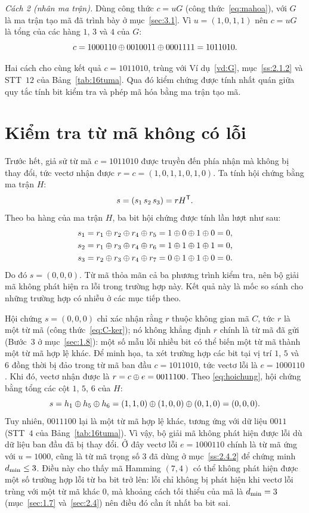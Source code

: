 \emph{Cách 2 (nhân ma trận).} Dùng công thức $c = uG$
(công thức~\eqref{eq:mahoa}), với $G$ là ma trận tạo mã đã trình bày ở
mục~\ref{sec:3.1}. Vì $u = (1,0,1,1)$ nên $c = uG$ là tổng của các hàng $1$, $3$
và $4$ của $G$:
\[
  c = 1000110 \oplus 0010011 \oplus 0001111 = 1011010 .
\]

Hai cách cho cùng kết quả $c = 1011010$, trùng với Ví dụ~\ref{vd:G},
mục~\ref{ss:2.1.2} và STT~$12$ của Bảng~\ref{tab:16tuma}. Qua đó kiểm chứng
được tính nhất quán giữa quy tắc tính bit kiểm tra và phép mã hóa bằng ma trận
tạo mã.

\section{Kiểm tra từ mã không có lỗi}
\label{sec:3.3}

Trước hết, giả sử từ mã $c = 1011010$ được truyền đến phía nhận mà không bị
thay đổi, tức vectơ nhận được $r = c = (1,0,1,1,0,1,0)$. Ta tính hội chứng bằng
ma trận $H$:
\[
  s = (s_1\,s_2\,s_3) = rH^{\mathsf{T}} .
\]
Theo ba hàng của ma trận $H$, ba bit hội chứng được tính lần lượt như sau:
\begin{align*}
  s_1 &= r_1 \oplus r_2 \oplus r_4 \oplus r_5 = 1 \oplus 0 \oplus 1 \oplus 0 = 0,\\*
  s_2 &= r_1 \oplus r_3 \oplus r_4 \oplus r_6 = 1 \oplus 1 \oplus 1 \oplus 1 = 0,\\*
  s_3 &= r_2 \oplus r_3 \oplus r_4 \oplus r_7 = 0 \oplus 1 \oplus 1 \oplus 0 = 0 .
\end{align*}
Do đó $s = (0,0,0)$. Từ mã thỏa mãn cả ba phương trình kiểm tra, nên bộ giải mã
không phát hiện ra lỗi trong trường hợp này. Kết quả này là mốc so sánh cho
những trường hợp có nhiễu ở các mục tiếp theo.

Hội chứng $s = (0,0,0)$ chỉ xác nhận rằng $r$ thuộc không gian mã $C$, tức $r$
là một từ mã (công thức~\eqref{eq:C-ker}); nó không khẳng định $r$ chính là từ
mã đã gửi (Bước~3 ở mục~\ref{sec:1.8}): một số mẫu lỗi nhiều bit có thể biến một từ
mã thành một từ mã hợp lệ khác. Để minh họa, ta xét trường hợp các bit tại vị trí $1$, $5$ và
$6$ đồng thời bị đảo trong từ mã ban đầu $c = 1011010$, tức vectơ lỗi là
$e = 1000110$. Khi đó, vectơ nhận được là $r = c \oplus e = 0011100$. Theo
\eqref{eq:hoichung}, hội chứng bằng tổng các cột $1$, $5$, $6$ của $H$:
\[
  s = h_1 \oplus h_5 \oplus h_6
    = (1,1,0) \oplus (1,0,0) \oplus (0,1,0) = (0,0,0).
\]
Tuy nhiên, $0011100$ lại là một từ mã hợp lệ khác, tương ứng với dữ liệu $0011$
(STT~$4$ của Bảng~\ref{tab:16tuma}). Vì vậy, bộ giải mã không phát hiện được
lỗi dù dữ liệu ban đầu đã bị thay đổi. Ở đây vectơ lỗi $e = 1000110$ chính là
từ mã ứng với $u = 1000$, cũng là từ mã trọng số $3$ đã dùng ở
mục~\ref{ss:2.4.2} để chứng minh $d_{\min} \le 3$. Điều này cho thấy mã Hamming
$(7,4)$ có thể không phát hiện được một số trường hợp lỗi từ ba bit trở lên:
lỗi chỉ không bị phát hiện khi vectơ lỗi trùng với một từ mã khác $0$, mà
khoảng cách tối thiểu của mã là $d_{\min} = 3$ (mục~\ref{sec:1.7}
và~\ref{sec:2.4}) nên điều đó cần ít nhất ba bit sai.

